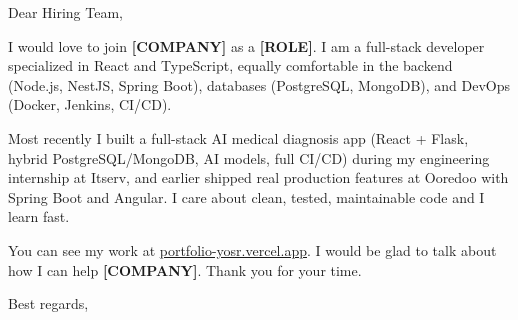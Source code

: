 \documentclass[11pt,a4paper]{letter}
\begin{document}
\begin{letter}{}

\opening{Dear Hiring Team,}

I would love to join \textbf{[COMPANY]} as a \textbf{[ROLE]}. I am a full-stack developer
specialized in React and TypeScript, equally comfortable in the backend (Node.js, NestJS,
Spring Boot), databases (PostgreSQL, MongoDB), and DevOps (Docker, Jenkins, CI/CD).

Most recently I built a full-stack AI medical diagnosis app (React + Flask, hybrid
PostgreSQL/MongoDB, AI models, full CI/CD) during my engineering internship at Itserv, and
earlier shipped real production features at Ooredoo with Spring Boot and Angular. I care
about clean, tested, maintainable code and I learn fast.

You can see my work at \href{https://portfolio-yosr.vercel.app/en}{portfolio-yosr.vercel.app}.
I would be glad to talk about how I can help \textbf{[COMPANY]}. Thank you for your time.

\closing{Best regards,}

\end{letter}
\end{document}
